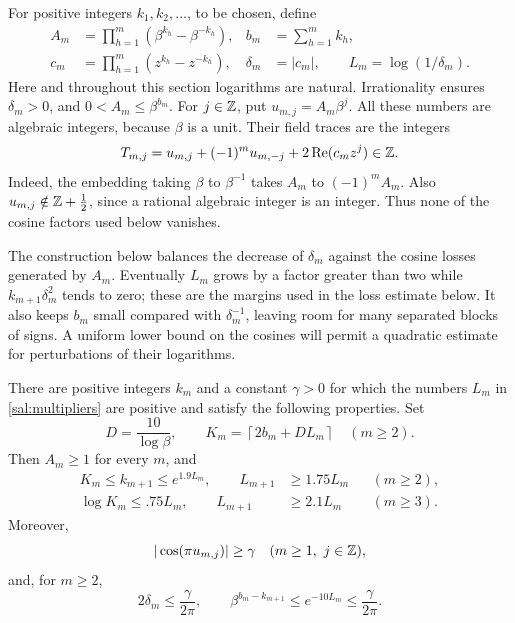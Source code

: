 For positive integers $k_1,k_2,\ldots$, to be chosen, define
\begin{equation}\label{sal:multipliers}
\begin{aligned}
 A_m&=\prod_{h=1}^m(\beta^{k_h}-\beta^{-k_h}),
 &b_m&=\sum_{h=1}^m k_h,\\
 c_m&=\prod_{h=1}^m(z^{k_h}-z^{-k_h}),
 &\delta_m&=|c_m|,\qquad L_m=\log(1/\delta_m).
\end{aligned}
\end{equation}
Here and throughout this section logarithms are natural.  Irrationality
ensures $\delta_m>0$, and $0<A_m\le\beta^{b_m}$.  For $j\in\mathbb Z$, put
$u_{m,j}=A_m\beta^j$.  All these numbers are algebraic integers, because
$\beta$ is a unit.  Their field traces are the integers
\begin{equation}\label{sal:trace}
 T_{m,j}=u_{m,j}+(-1)^m u_{m,-j}
                  +2\operatorname{Re}(c_mz^j)\in\mathbb Z.
\end{equation}
Indeed, the embedding taking $\beta$ to $\beta^{-1}$ takes $A_m$ to
$(-1)^mA_m$.  Also $u_{m,j}\notin\mathbb Z+\tfrac12$, since a rational algebraic
integer is an integer.  Thus none of the cosine factors used below
vanishes.

The construction below balances the decrease of $\delta_m$ against the
cosine losses generated by $A_m$.  Eventually $L_m$ grows by a factor
greater than two while $k_{m+1}\delta_m^2$ tends to zero; these are the
margins used in the loss estimate below.  It also keeps $b_m$ small
compared with $\delta_m^{-1}$, leaving room for many separated blocks of
signs.  A uniform lower bound on the cosines will permit a quadratic
estimate for perturbations of their logarithms.

\begin{lemma}\label{sal:construction}
There are positive integers $k_m$ and a constant $\gamma>0$ for which
the numbers $L_m$ in \eqref{sal:multipliers} are positive and satisfy
the following properties.
Set
\[
 D=\frac{10}{\log\beta},\qquad
 K_m=\left\lceil2b_m+DL_m\right\rceil\quad(m\ge2).
\]
Then $A_m\ge1$ for every $m$, and
\begin{align}
 K_m\le k_{m+1}\le e^{1.9L_m},\qquad
 L_{m+1}&\ge1.75L_m &&(m\ge2),\label{sal:growth-initial}\\
 \log K_m\le .75L_m,\qquad
 L_{m+1}&\ge2.1L_m &&(m\ge3).\label{sal:growth} 
\end{align}
Moreover,
\begin{equation}\label{sal:cosine-floor}
 |\cos(\pi u_{m,j})|\ge\gamma
       \quad(m\ge1,\ j\in\mathbb Z),
\end{equation}
and, for $m\ge2$,
\begin{equation}\label{sal:small-errors}
 2\delta_m\le\frac{\gamma}{2\pi},\qquad
 \beta^{b_m-k_{m+1}}\le e^{-10L_m}
                       \le\frac{\gamma}{2\pi}.
\end{equation}
\end{lemma}

